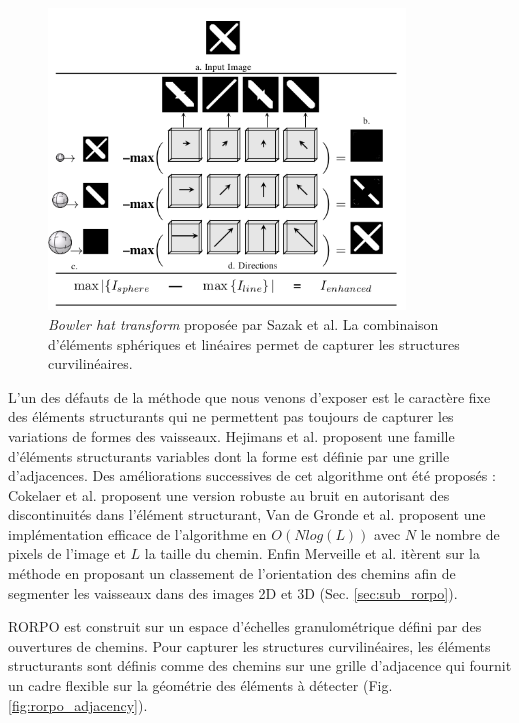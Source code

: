\begin{figure}[h]
\centering
\includegraphics[height=8cm]{Images/bowlerHat_3D.png}
\caption{\textit{Bowler hat transform} proposée par Sazak et al. \cite{Sazak2018_bowler_hat_3D} La combinaison d'éléments sphériques et linéaires permet de capturer les structures curvilinéaires. }
\label{fig:sazak_bowler_hat}
\end{figure}

L'un des défauts de la méthode que nous venons d'exposer est le caractère fixe des éléments structurants qui ne permettent pas toujours de capturer les variations de formes des vaisseaux. Hejimans et al. \cite{Heijmans2005_path_opening} proposent une famille d'éléments structurants variables dont la forme est définie par une grille d'adjacences. Des améliorations successives de cet algorithme ont été proposés : Cokelaer et al. \cite{Cokelaer2012_efficient_path_opening} proposent une version robuste au bruit en autorisant des discontinuités dans l'élément structurant, Van de Gronde et al. \cite{Gronde2015_fast_path_opening} proposent une implémentation efficace de l'algorithme en $O( N log ( L ))$ avec $N$ le nombre de pixels de l'image et $L$ la taille du chemin. Enfin Merveille et al. \cite{Merveille2018_curvilinear} itèrent sur la méthode en proposant un classement de l'orientation des chemins afin de segmenter les vaisseaux dans des images 2D et 3D (Sec. \ref{sec:sub_rorpo}). 

\label{sec:sub_rorpo}

RORPO \cite{Merveille2018_curvilinear} est construit sur un espace d'échelles granulométrique défini par des ouvertures de chemins. Pour capturer les structures curvilinéaires, les éléments structurants sont définis comme des chemins sur une grille d'adjacence qui fournit un cadre flexible sur la géométrie des éléments à détecter (Fig. \ref{fig:rorpo_adjacency}). 

